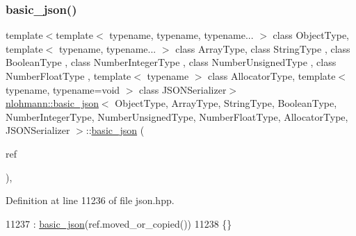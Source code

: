 \subsubsection{\texorpdfstring{basic\+\_\+json()}{basic\_json()}\hspace{0.1cm}{\footnotesize\ttfamily [7/9]}}
{\footnotesize\ttfamily template$<$template$<$ typename, typename, typename... $>$ class Object\+Type, template$<$ typename, typename... $>$ class Array\+Type, class String\+Type , class Boolean\+Type , class Number\+Integer\+Type , class Number\+Unsigned\+Type , class Number\+Float\+Type , template$<$ typename $>$ class Allocator\+Type, template$<$ typename, typename=void $>$ class J\+S\+O\+N\+Serializer$>$ \\
\hyperlink{classnlohmann_1_1basic__json}{nlohmann\+::basic\+\_\+json}$<$ Object\+Type, Array\+Type, String\+Type, Boolean\+Type, Number\+Integer\+Type, Number\+Unsigned\+Type, Number\+Float\+Type, Allocator\+Type, J\+S\+O\+N\+Serializer $>$\+::\hyperlink{classnlohmann_1_1basic__json}{basic\+\_\+json} (\begin{DoxyParamCaption}\item[{const \hyperlink{classnlohmann_1_1detail_1_1json__ref}{detail\+::json\+\_\+ref}$<$ \hyperlink{classnlohmann_1_1basic__json}{basic\+\_\+json}$<$ Object\+Type, Array\+Type, String\+Type, Boolean\+Type, Number\+Integer\+Type, Number\+Unsigned\+Type, Number\+Float\+Type, Allocator\+Type, J\+S\+O\+N\+Serializer $>$ $>$ \&}]{ref }\end{DoxyParamCaption})\hspace{0.3cm}{\ttfamily [inline]}, {\ttfamily [private]}}



Definition at line 11236 of file json.\+hpp.


\begin{DoxyCode}
11237         : \hyperlink{classnlohmann_1_1basic__json_aed115142bd0c6c66c864700e0467df55}{basic\_json}(ref.moved\_or\_copied())
11238     \{\}
\end{DoxyCode}
\mbox{\label{classnlohmann_1_1basic__json_af5de621bcf646c332343f9c1e011126c}} 
